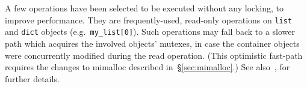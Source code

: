 A few operations have been selected to be executed without any locking, to improve performance.
They are frequently-used, read-only operations on \texttt{list} and \texttt{dict} objects (e.g.\ \texttt{{my\_list[0]}}).
Such operations may fall back to a slower path which acquires the involved objects' mutexes, in case the container objects were concurrently modified during the read operation.
(This optimistic fast-path requires the changes to mimalloc described in~\S\ref{sec:mimalloc}.)
See also~\cite[\S Optimistically Avoiding Locking]{pep703}, for further details.
